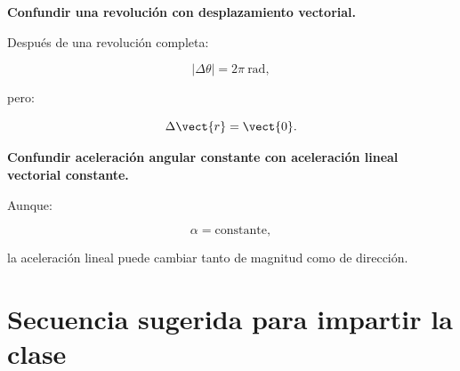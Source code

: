 \begin{errorfrecuente}

\textbf{Confundir una revolución con desplazamiento vectorial.}

Después de una revolución completa:

\[
|\Delta\theta|=2\pi\ \si{\radian},
\]

pero:

\[
\Delta\vect{r}=\vect{0}.
\]

\end{errorfrecuente}


\begin{errorfrecuente}

\textbf{Confundir aceleración angular constante con aceleración lineal
vectorial constante.}

Aunque:

\[
\alpha=\text{constante},
\]

la aceleración lineal puede cambiar tanto de magnitud como de dirección.

\end{errorfrecuente}


\section{Secuencia sugerida para impartir la clase}

